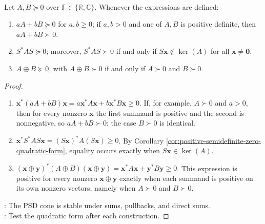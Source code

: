 \begin{theorem} \label{thm:positive-semidefinite-stability-rules} \\
Let $A,B\succeq0$ over $\mathbb{F}\in\{\mathbb{R},\mathbb{C}\}$. Whenever the expressions are defined:
\begin{enumerate}[label=(\roman*)]
\setlength{\itemsep}{0pt}
\item $aA+bB\succeq0$ for $a,b\geq0$; if $a,b>0$ and one of $A,B$ is positive definite, then $aA+bB\succ0$.
\item $S^*AS\succeq0$; moreover, $S^*AS\succ0$ if and only if $S\mathbf{x}\notin\ker(A)$ for all $\mathbf{x}\neq\mathbf{0}$.
\item $A\oplus B\succeq0$, with $A\oplus B\succ0$ if and only if $A\succ0$ and $B\succ0$.
\end{enumerate}
\begin{proof}
\begin{enumerate}[label=(\roman*)]
\setlength{\itemsep}{0pt}
\item $\mathbf{x}^*(aA+bB)\mathbf{x}=a\mathbf{x}^*A\mathbf{x}+b\mathbf{x}^*B\mathbf{x}\geq0$. If, for example, $A\succ0$ and $a>0$, then for every nonzero $\mathbf{x}$ the first summand is positive and the second is nonnegative, so $aA+bB\succ0$; the case $B\succ0$ is identical.
\item $\mathbf{x}^*S^*AS\mathbf{x}=(S\mathbf{x})^*A(S\mathbf{x})\geq0$. By Corollary \ref{cor:positive-semidefinite-zero-quadratic-form}, equality occurs exactly when $S\mathbf{x}\in\ker(A)$.
\item $(\mathbf{x}\oplus\mathbf{y})^*(A\oplus B)(\mathbf{x}\oplus\mathbf{y})=\mathbf{x}^*A\mathbf{x}+\mathbf{y}^*B\mathbf{y}\geq0$. This expression is positive for every nonzero $\mathbf{x}\oplus\mathbf{y}$ exactly when each summand is positive on its own nonzero vectors, namely when $A\succ0$ and $B\succ0$.
\end{enumerate}
: The PSD cone is stable under sums, pullbacks, and direct sums.\\
: Test the quadratic form after each construction.
\end{proof}
\end{theorem}

